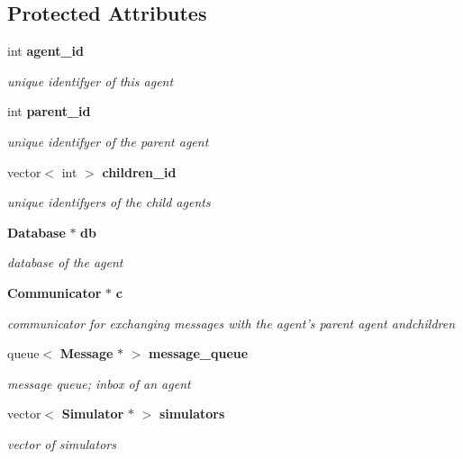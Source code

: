 \subsection*{Protected Attributes}
\begin{CompactItemize}
\item 
int {\bf agent\_\-id}
\begin{CompactList}\small\item\em unique identifyer of this agent \item\end{CompactList}\item 
int {\bf parent\_\-id}
\begin{CompactList}\small\item\em unique identifyer of the parent agent \item\end{CompactList}\item 
vector$<$ int $>$ {\bf children\_\-id}
\begin{CompactList}\small\item\em unique identifyers of the child agents \item\end{CompactList}\item 
{\bf Database} $\ast$ {\bf db}
\begin{CompactList}\small\item\em database of the agent \item\end{CompactList}\item 
{\bf Communicator} $\ast$ {\bf c}
\begin{CompactList}\small\item\em communicator for exchanging messages with the agent's parent agent andchildren \item\end{CompactList}\item 
queue$<$ {\bf Message} $\ast$ $>$ {\bf message\_\-queue}
\begin{CompactList}\small\item\em message queue; inbox of an agent \item\end{CompactList}\item 
vector$<$ {\bf Simulator} $\ast$ $>$ {\bf simulators}
\begin{CompactList}\small\item\em vector of simulators \item\end{CompactList}\item 

\end{CompactItemize}
